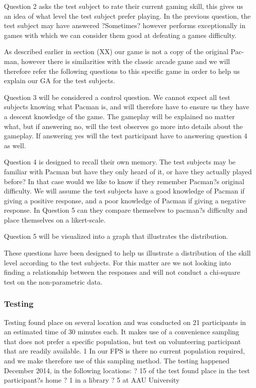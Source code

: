 Question 2 asks the test subject to rate their current gaming skill, this gives us an idea of what level the test subject prefer playing. In the previous question, the test subject may have answered ?Sometimes? however performs exceptionally in games with which we can consider them good at defeating a games difficulty.  

As described earlier in section (XX) our game is not a copy of the original Pac-man, however there is similarities with the classic arcade game and we will therefore refer the following questions to this specific game in order to help us explain our GA for the test subjects. 

Question 3 will be considered a control question. We cannot expect all test subjects knowing what Pacman is, and will therefore have to ensure us they have a descent knowledge of the game. The gameplay will be explained no matter what, but if answering no, will the test observes go more into details about the gameplay. If answering yes will the test participant have to answering question 4 as well. 

Question 4 is designed to recall their own memory. The test subjects may be familiar with Pacman but have they only heard of it, or have they actually played before? In that case would we like to know if they remember Pacman?s original difficulty. We will assume the test subjects have a good knowledge of Pacman if giving a positive response, and a poor knowledge of Pacman if giving a negative response. In Question 5 can they compare themselves to pacman?s difficulty and place themselves on a likert-scale.

Question 5 will be visualized into a graph that illustrates the distribution. 

These questions have been designed to help us illustrate a distribution of the skill level according to the test subjects. For this matter are we not looking into finding a relationship between the responses and will not conduct a chi-square test on the non-parametric data. 
 
\subsubsection{Testing}
Testing found place on several location and was conducted on 21 participants in an estimated time of 30 minutes each. 
It makes use of a convenience sampling that does not prefer a specific population, but test on volunteering participant that are readily available. {1} In our FPS is there no current population required, and we make therefore use of this sampling method. The testing happened December 2014, in the following locations: 
?	15 of the test found place in the test participant?s home 
?	1 in a library 
?	5 at AAU University 

